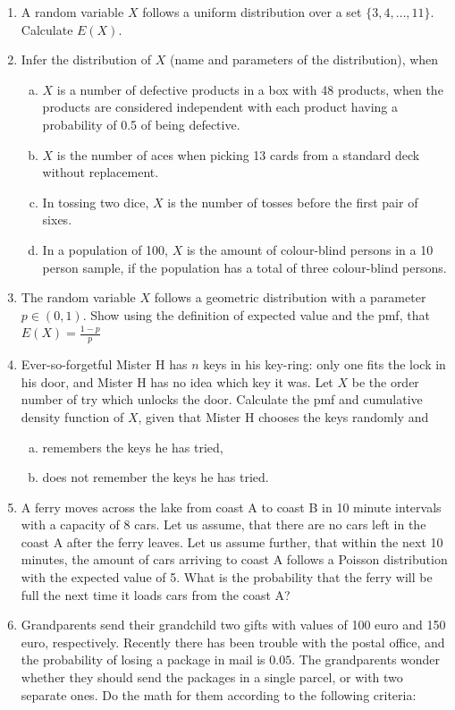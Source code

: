 \documentclass[12pt,a4paper,leqno]{report}
\theoremstyle{plain}
\theoremstyle{definition}
\begin{document}
\begin{enumerate}
\item A random variable $X$ follows a uniform distribution over a set $\{3, 4, \ldots, 11\}$. Calculate $E(X)$.
\item Infer the distribution of $X$ (name and parameters of the distribution), when
\begin{enumerate}[(a)]
\item $X$ is a number of defective products in a box with 48 products, when the products are considered independent with each product having a probability of 0.5 of being defective.
\item $X$ is the number of aces when picking 13 cards from a standard deck without replacement.
\item In tossing two dice, $X$ is the number of tosses before the first pair of sixes.
\item In a population of 100, $X$ is the amount of colour-blind persons in a 10 person sample, if the population has a total of three colour-blind persons.
\end{enumerate}
\item The random variable $X$ follows a geometric distribution with a parameter $p \in (0,1)$. Show using the definition of expected value and the pmf, that $E(X) = \frac{1-p}{p}$
\item Ever-so-forgetful Mister H has $n$ keys in his key-ring: only one fits the lock in his door, and Mister H has no idea which key it was. Let $X$ be the order number of try which unlocks the door. Calculate the pmf and cumulative density function of $X$, given that Mister H chooses the keys randomly and
\begin{enumerate}[(a)]
\item remembers the keys he has tried,
\item does not remember the keys he has tried.
\end{enumerate}
\item A ferry moves across the lake from coast A to coast B in 10 minute intervals with a capacity of 8 cars. Let us assume, that there are no cars left in the coast A after the ferry leaves. Let us assume further, that within the next 10 minutes, the amount of cars arriving to coast A follows a Poisson distribution with the expected value of 5. What is the probability that the ferry will be full the next time it loads cars from the coast A?
\item Grandparents send their grandchild two gifts with values of 100 euro and 150 euro, respectively. Recently there has been trouble with the postal office, and the probability of losing a package in mail is $0.05$. The grandparents wonder whether they should send the packages in a single parcel, or with two separate ones. Do the math for them according to the following criteria:

\end{enumerate}
\end{document}
